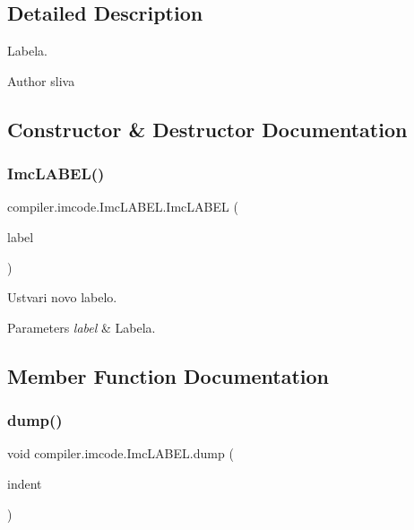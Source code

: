 \subsection{Detailed Description}
Labela.

\begin{DoxyAuthor}{Author}
sliva 
\end{DoxyAuthor}


\subsection{Constructor \& Destructor Documentation}
\mbox{\label{classcompiler_1_1imcode_1_1_imc_l_a_b_e_l_a66919e264ef6b8e398c3c59851240694}} 
\subsubsection{\texorpdfstring{Imc\+L\+A\+B\+E\+L()}{ImcLABEL()}}
{\footnotesize\ttfamily compiler.\+imcode.\+Imc\+L\+A\+B\+E\+L.\+Imc\+L\+A\+B\+EL (\begin{DoxyParamCaption}\item[{\hyperlink{classcompiler_1_1frames_1_1_frm_label}{Frm\+Label}}]{label }\end{DoxyParamCaption})}

Ustvari novo labelo.


\begin{DoxyParams}{Parameters}
{\em label} & Labela. \\
\hline
\end{DoxyParams}


\subsection{Member Function Documentation}
\mbox{\label{classcompiler_1_1imcode_1_1_imc_l_a_b_e_l_a69b88217423419c1c8ba9f2bd7bb3e8f}} 
\subsubsection{\texorpdfstring{dump()}{dump()}}
{\footnotesize\ttfamily void compiler.\+imcode.\+Imc\+L\+A\+B\+E\+L.\+dump (\begin{DoxyParamCaption}\item[{int}]{indent }\end{DoxyParamCaption})}


